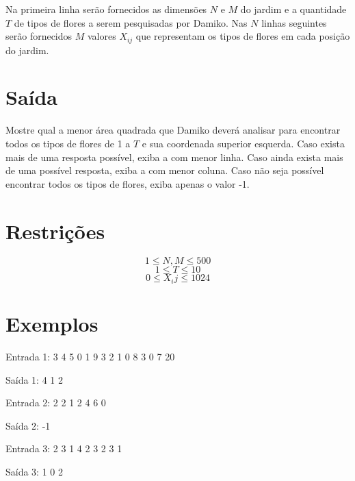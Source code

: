 \documentclass{article}
\begin{document}
Na primeira linha serão fornecidos as dimensões $N$ e $M$ do jardim e a quantidade $T$ de tipos de flores a serem pesquisadas por Damiko. Nas $N$ linhas seguintes serão fornecidos $M$ valores $X_{ij}$ que representam os tipos de flores em cada posição do jardim.

\section*{Saída}

Mostre qual a menor área quadrada que Damiko deverá analisar para encontrar todos os tipos de flores de 1 a $T$ e sua coordenada superior esquerda. Caso exista mais de uma resposta possível, exiba a com menor linha. Caso ainda exista mais de uma possível resposta, exiba a com menor coluna. Caso não seja possível encontrar todos os tipos de flores, exiba apenas o valor -1.

\section*{Restrições}

$$1 \leq N,M \leq 500$$
$$1 \leq T \leq 10$$
$$0 \leq X_ij \leq 1024$$

\section*{Exemplos}
Entrada 1:
3 4 5
0 1 9 3
2 1 0 8
3 0 7 20

Saída 1:
4
1 2

Entrada 2:
2 2 1
2 4
6 0

Saída 2:
-1

Entrada 3:
2 3 1
4 2 3
2 3 1

Saída 3:
1
0 2

\exemplo
\end{document}
